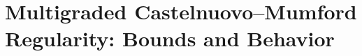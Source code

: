 \documentclass[11pt,reqno]{amsart}
\newtheorem{conjecture}[lemma]{Conjecture}
\theoremstyle{remark}
\newcommand{\BE}{\operatorname{BE}}
\newcommand{\cD}{\mathcal{D}}
\newcommand{\cX}{\mathcal{X}}
\begin{document}
%
% 
%
%	
\section{Multigraded Castelnuovo–Mumford Regularity: Bounds and Behavior}\label{sec:multigraded-regularity}
\end{document}
